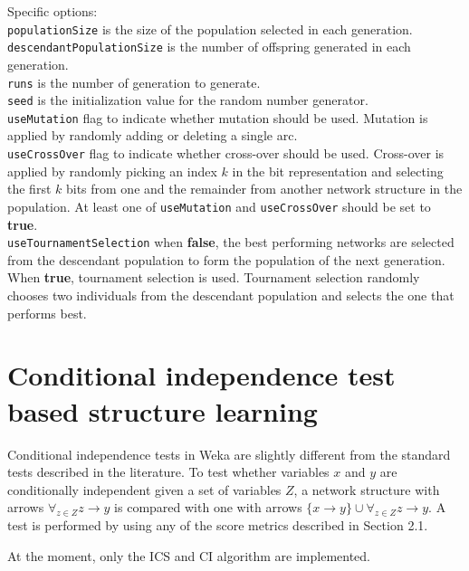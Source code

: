 \begin{itemize}
Specific options:\\
{\tt populationSize} is the size of the population selected in each generation.\\
{\tt descendantPopulationSize} is the number of offspring generated in each generation.\\
{\tt runs} is the number of generation to generate.\\
{\tt seed} is the initialization value for the random number generator.\\
{\tt useMutation} flag to indicate whether mutation should be used. Mutation is applied by
randomly adding or deleting a single arc.\\
{\tt useCrossOver} flag to indicate whether cross-over should be used. Cross-over is applied
by randomly picking an index $k$ in the bit representation and selecting the first $k$ bits
from one and the remainder from another network structure in the population.
At least one of \texttt{useMutation} and \texttt{useCrossOver} should be set to \textbf{true}.\\
{\tt useTournamentSelection} when \textbf{false}, the best performing networks are selected from
the descendant population to form the population of the next generation. 
When \textbf{true}, tournament selection is used. Tournament selection randomly chooses two
individuals from the descendant population and selects the one that performs best.\\
\end{itemize}

\section{Conditional independence test based structure learning}

Conditional independence tests in Weka are slightly different from the
standard tests described in the literature. To test whether variables
$x$ and $y$ are conditionally independent given a set of variables $Z$,
a network structure with arrows $\forall_{z\in Z}z \to y$ is compared with
one with arrows $\{x\to y\} \cup \forall_{z\in Z}z \to y$. 
A test is performed by using any of the score metrics described in Section 
2.1.

\begin{center}
\end{center}

At the moment, only the ICS  \cite{verma}and CI algorithm are implemented. 

